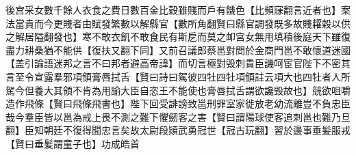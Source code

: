 後宫采女數千餘人衣食之費日數百金比穀雖賤而戶有饑色【比頻寐翻言近者也】案法當貴而今更賤者由賦發繁數以解縣官【數所角翻賢曰縣官調發既多故賤糶穀以供之解居隘翻發也】寒不敢衣飢不敢食民有斯戹而莫之卹宫女無用填積後庭天下雖復盡力耕桑猶不能供【復扶又翻下同】又前召議郎蔡邕對問於金商門邕不敢懷道迷國【盖引論語迷邦之言不曰邦者避高帝諱】而切言極對毁刺貴臣譏呵宦官陛下不密其言至令宣露羣邪項領膏唇拭舌【賢曰詩曰駕彼四牡四牡項領註云項大也四牡者人所駕今但養大其領不肯為用諭大臣自恣王不能使也膏唇拭舌謂欲讒毁故也】競欲咀嚼造作飛條【賢曰飛條飛書也】陛下回受誹謗致邕刑罪室家徙放老幼流離豈不負忠臣哉今羣臣皆以邕為戒上畏不測之難下懼劒客之害【賢曰謂陽球使客追刺邕也難乃旦翻】臣知朝廷不復得聞忠言矣故太尉段熲武勇冠世【冠古玩翻】習於邊事垂髪服戎【賢曰垂髪謂童子也】功成皓首